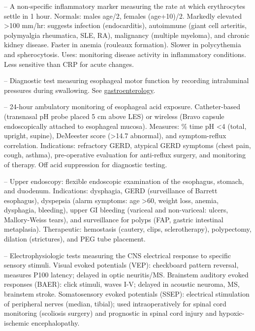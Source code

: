-- A non-specific inflammatory marker measuring the rate at which erythrocytes settle in 1 hour. Normals: males age/2, females (age+10)/2. Markedly elevated >100 mm/hr: suggests infection (endocarditis), autoimmune (giant cell arteritis, polymyalgia rheumatica, SLE, RA), malignancy (multiple myeloma), and chronic kidney disease. Faster in anemia (rouleaux formation). Slower in polycythemia and spherocytosis. Uses: monitoring disease activity in inflammatory conditions. Less sensitive than CRP for acute changes.

-- Diagnostic test measuring esophageal motor function by recording intraluminal pressures during swallowing. See \hyperlink{Gastroenterology}{gastroenterology}.

-- 24-hour ambulatory monitoring of esophageal acid exposure. Catheter-based (transnasal pH probe placed 5 cm above LES) or wireless (Bravo capsule endoscopically attached to esophageal mucosa). Measures: \% time pH <4 (total, upright, supine), DeMeester score (>14.7 abnormal), and symptom-reflux correlation. Indications: refractory GERD, atypical GERD symptoms (chest pain, cough, asthma), pre-operative evaluation for anti-reflux surgery, and monitoring of therapy. Off acid suppression for diagnostic testing.

-- Upper endoscopy: flexible endoscopic examination of the esophagus, stomach, and duodenum. Indications: dysphagia, GERD (surveillance of Barrett esophagus), dyspepsia (alarm symptoms: age >60, weight loss, anemia, dysphagia, bleeding), upper GI bleeding (variceal and non-variceal: ulcers, Mallory-Weiss tears), and surveillance for polyps (FAP, gastric intestinal metaplasia). Therapeutic: hemostasis (cautery, clips, sclerotherapy), polypectomy, dilation (strictures), and PEG tube placement.

-- Electrophysiologic tests measuring the CNS electrical response to specific sensory stimuli. Visual evoked potentials (VEP): checkboard pattern reversal, measures P100 latency; delayed in optic neuritis/MS. Brainstem auditory evoked responses (BAER): click stimuli, waves I-V; delayed in acoustic neuroma, MS, brainstem stroke. Somatosensory evoked potentials (SSEP): electrical stimulation of peripheral nerves (median, tibial); used intraoperatively for spinal cord monitoring (scoliosis surgery) and prognostic in spinal cord injury and hypoxic-ischemic encephalopathy.

